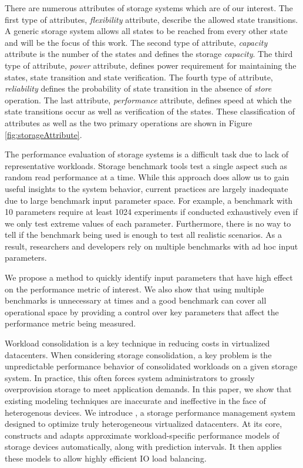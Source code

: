 There are numerous attributes of storage systems which are of our interest.
The first type of attributes, \emph{flexibility} attribute, describe the allowed state transitions.
A generic storage system allows all states to be reached from every other state and will be the focus of this work.
The second type of attribute, \emph{capacity} attribute is the number of the states and defines the storage \emph{capacity}.
The third type of attribute, \emph{power} attribute, defines power requirement for maintaining the states, state transition and state verification.
The fourth type of attribute, \emph{reliability} defines the probability of state transition in the absence of \emph{store} operation.
The last attribute, \emph{performance} attribute, defines speed at which the state transitions occur as well as verification of the states.
These classification of attributes as well as the two primary operations are shown in Figure \ref{fig:storageAttribute}.

The performance evaluation of storage systems is a difficult task due to lack of representative workloads. Storage benchmark tools test a single aspect such as random read performance at a time. While this approach does allow us to gain useful insights to the system behavior, current practices are largely inadequate due to large benchmark input parameter space. For example, a benchmark with 10 parameters require at least 1024 experiments if conducted exhaustively even if we only test extreme values of each parameter. Furthermore, there is no way to tell if the benchmark being used is enough to test all realistic scenarios. As a result, researchers and developers rely on multiple benchmarks with ad hoc input parameters.

We propose a method to quickly identify input parameters that have high effect on the performance metric of interest. We also show that using multiple benchmarks is unnecessary at times and a good benchmark can cover all operational space by providing a control over key parameters that affect the performance metric being measured. 


Workload consolidation is a key technique in reducing costs in virtualized datacenters.
When considering storage consolidation, a key problem is the unpredictable performance behavior of consolidated workloads on a given storage system.
In practice, this often forces system administrators to grossly overprovision storage to meet application demands.
In this paper, we show that existing modeling techniques are inaccurate and ineffective in the face of heterogenous devices.
We introduce {\em\romano}, a storage performance management system designed to optimize truly heterogeneous virtualized datacenters.
At its core, \romano constructs and adapts approximate workload-specific performance models of storage devices automatically, along with prediction intervals.
It then applies these models to allow highly efficient IO load balancing.

